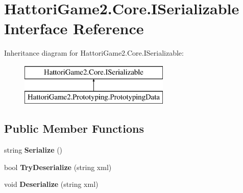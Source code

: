 \hypertarget{interface_hattori_game2_1_1_core_1_1_i_serializable}{}\section{Hattori\+Game2.\+Core.\+I\+Serializable Interface Reference}
\label{interface_hattori_game2_1_1_core_1_1_i_serializable}
Inheritance diagram for Hattori\+Game2.\+Core.\+I\+Serializable\+:\begin{figure}[H]
\begin{center}
\leavevmode
\includegraphics[height=2.000000cm]{interface_hattori_game2_1_1_core_1_1_i_serializable}
\end{center}
\end{figure}
\subsection*{Public Member Functions}
\begin{DoxyCompactItemize}
\item 
\hypertarget{interface_hattori_game2_1_1_core_1_1_i_serializable_a592ef615cfa80d4298df77309ab266d0}{}string {\bfseries Serialize} ()\label{interface_hattori_game2_1_1_core_1_1_i_serializable_a592ef615cfa80d4298df77309ab266d0}

\item 
\hypertarget{interface_hattori_game2_1_1_core_1_1_i_serializable_a6826d9742d146f8b711fd7021c54933c}{}bool {\bfseries Try\+Deserialize} (string xml)\label{interface_hattori_game2_1_1_core_1_1_i_serializable_a6826d9742d146f8b711fd7021c54933c}

\item 
\hypertarget{interface_hattori_game2_1_1_core_1_1_i_serializable_a71b58a42e6259425a351cf7c8383717e}{}void {\bfseries Deserialize} (string xml)\label{interface_hattori_game2_1_1_core_1_1_i_serializable_a71b58a42e6259425a351cf7c8383717e}

\end{DoxyCompactItemize}
